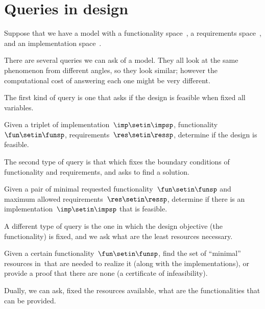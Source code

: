 
\section{Queries in design}


Suppose that we have a model with a functionality space~\funsp, a requirements space~\ressp, and an implementation space~\impsp.

There are several queries we can ask of a model.
They all look at the same phenomenon from different angles, so they look similar;
however the computational cost of answering each one might be very different.

The first kind of query is one that asks if the design is feasible when fixed all variables.

\begin{problem}
Given a triplet of implementation~$\imp\setin\impsp$, functionality~$\fun\setin\funsp$, requirements~$\res\setin\ressp$, determine if the design is feasible.
\end{problem}

The second type of query is that which fixes the boundary conditions of functionality and requirements, and asks to find a solution.

\begin{problem}
Given a pair of minimal requested functionality~$\fun\setin\funsp$ and maximum allowed requirements~$\res\setin\ressp$, determine if there is an implementation~$\imp\setin\impsp$ that is feasible.
\end{problem}

A different type of query is the one in which the design objective (the functionality) is fixed, and we ask what are the least resources necessary.

\begin{problem}[\FixFunMinRes]
\label{prob:FixFunMinRes-informal}
Given a certain functionality~$\fun\setin\funsp$, find the set of ``minimal'' resources in~\ressp that are needed to realize it (along with the implementations), or provide a proof that there are none (a certificate of infeasibility).
\end{problem}

Dually, we can ask, fixed the resources available, what are the functionalities that can be provided.

